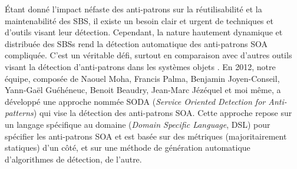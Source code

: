 \begin{introduction}
\'Etant donn\'e l'impact n\'efaste des anti-patrons sur la r\'eutilisabilit\'e et la maintenabilit\'e des SBS, il existe un besoin clair et urgent de techniques et d'outils visant leur d\'etection.
Cependant, la nature hautement dynamique et distribu\'ee des SBSs rend la d\'etection automatique des anti-patrons SOA compliqu\'ee.
C'est un v\'eritable d\'efi, surtout en comparaison avec d'autres outils visant la d\'etection d'anti-patrons dans les syst\`emes objets \citep{Marinescu2004, Fokaefs2007, Moha2010}.
En 2012, notre \'equipe, compos\'ee de Naouel Moha, Francis Palma, Benjamin Joyen-Conseil, Yann-Ga\"el Gu\'eh\'eneuc, Benoit Beaudry, Jean-Marc J\'ez\'equel et moi m\^eme, a d\'evelopp\'e une approche nomm\'ee SODA (\textit{Service Oriented Detection for Anti-patterns}) \citep{Nayrolles, Moha} qui vise la d\'etection des anti-patrons SOA.
Cette approche repose sur un langage sp\'ecifique au domaine (\textit{Domain Specific Language}, DSL) pour sp\'ecifier les anti-patrons SOA et est bas\'ee sur des m\'etriques (majoritairement statiques) d'un c\^ot\'e, et sur une m\'ethode de g\'en\'eration automatique d'algorithmes de d\'etection, de l'autre.



\end{introduction}
